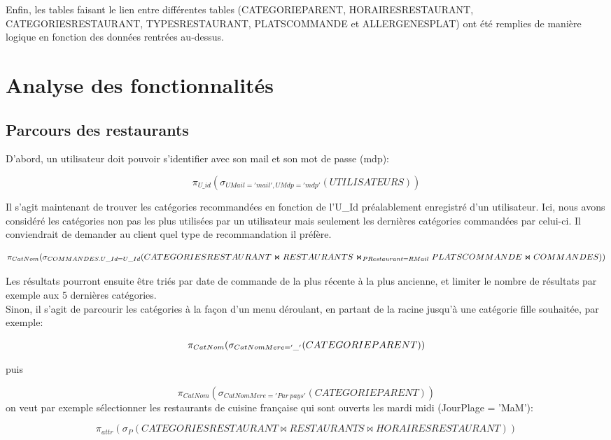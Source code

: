 \documentclass[10pt, a4paper]{article}
\begin{document}
Enfin, les tables faisant le lien entre différentes tables (CATEGORIEPARENT, HORAIRESRESTAURANT, CATEGORIESRESTAURANT, TYPESRESTAURANT, PLATSCOMMANDE et ALLERGENESPLAT) ont été remplies de manière logique en fonction des données rentrées au-dessus.

\section{Analyse des fonctionnalités}
\subsection{Parcours des restaurants}

D'abord, un utilisateur doit pouvoir s'identifier avec son mail et son mot de passe (mdp):

\[
    \pi_{U\_id}(\sigma_{UMail='mail', UMdp='mdp'}(UTILISATEURS))
\]

Il s'agit maintenant de trouver les catégories recommandées en fonction de l'U\_Id préalablement enregistré d'un utilisateur. Ici, nous avons considéré les catégories non pas les plus utilisées par un utilisateur mais seulement les dernières catégories commandées par celui-ci. Il conviendrait de demander au client quel type de recommandation il préfère.

\[
    \pi_{CatNom}(\sigma_{COMMANDES.U\_Id = U\_Id}(CATEGORIESRESTAURANT \Join RESTAURANTS \\ \Join_{PRestaurant = RMail} PLATSCOMMANDE \Join COMMANDES))
\]

Les résultats pourront ensuite être triés par date de commande de la plus récente à la plus ancienne, et limiter le nombre de résultats par exemple aux 5 dernières catégories.
\\

Sinon, il s'agit de parcourir les catégories à la façon d'un menu déroulant, en partant de la racine jusqu'à une catégorie fille souhaitée, par exemple:

\[
    \pi_{CatNom}(\sigma_{CatNomMere='\_'}(CATEGORIEPARENT)) \\
\]

puis

\[
    \pi_{CatNom}(\sigma_{CatNomMere='Par\ pays'}(CATEGORIEPARENT))
\]
on veut par exemple sélectionner les restaurants de cuisine française qui sont ouverts les mardi midi (JourPlage = 'MaM'):

\[
    \pi_{attr}(\sigma_{P}(CATEGORIESRESTAURANT \Join RESTAURANTS \Join HORAIRESRESTAURANT))
\]
\end{document}
